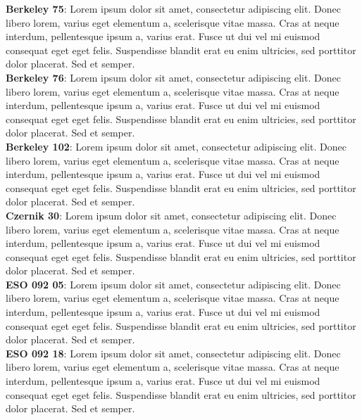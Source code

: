 \documentclass{aa}
\begin{document}
 \noindent\textbf{Berkeley 75}: Lorem ipsum dolor sit amet, consectetur adipiscing elit. Donec libero lorem, varius eget elementum a, scelerisque vitae massa. Cras at neque interdum, pellentesque ipsum a, varius erat. Fusce ut dui vel mi euismod consequat eget eget felis. Suspendisse blandit erat eu enim ultricies, sed porttitor dolor placerat. Sed et semper.\\

 \noindent\textbf{Berkeley 76}: Lorem ipsum dolor sit amet, consectetur adipiscing elit. Donec libero lorem, varius eget elementum a, scelerisque vitae massa. Cras at neque interdum, pellentesque ipsum a, varius erat. Fusce ut dui vel mi euismod consequat eget eget felis. Suspendisse blandit erat eu enim ultricies, sed porttitor dolor placerat. Sed et semper.\\

 \noindent\textbf{Berkeley 102}: Lorem ipsum dolor sit amet, consectetur adipiscing elit. Donec libero lorem, varius eget elementum a, scelerisque vitae massa. Cras at neque interdum, pellentesque ipsum a, varius erat. Fusce ut dui vel mi euismod consequat eget eget felis. Suspendisse blandit erat eu enim ultricies, sed porttitor dolor placerat. Sed et semper.\\

 \noindent\textbf{Czernik 30}: Lorem ipsum dolor sit amet, consectetur adipiscing elit. Donec libero lorem, varius eget elementum a, scelerisque vitae massa. Cras at neque interdum, pellentesque ipsum a, varius erat. Fusce ut dui vel mi euismod consequat eget eget felis. Suspendisse blandit erat eu enim ultricies, sed porttitor dolor placerat. Sed et semper.\\

 \noindent\textbf{ESO 092 05}: Lorem ipsum dolor sit amet, consectetur adipiscing elit. Donec libero lorem, varius eget elementum a, scelerisque vitae massa. Cras at neque interdum, pellentesque ipsum a, varius erat. Fusce ut dui vel mi euismod consequat eget eget felis. Suspendisse blandit erat eu enim ultricies, sed porttitor dolor placerat. Sed et semper.\\

 \noindent\textbf{ESO 092 18}: Lorem ipsum dolor sit amet, consectetur adipiscing elit. Donec libero lorem, varius eget elementum a, scelerisque vitae massa. Cras at neque interdum, pellentesque ipsum a, varius erat. Fusce ut dui vel mi euismod consequat eget eget felis. Suspendisse blandit erat eu enim ultricies, sed porttitor dolor placerat. Sed et semper.\\
\end{document}
